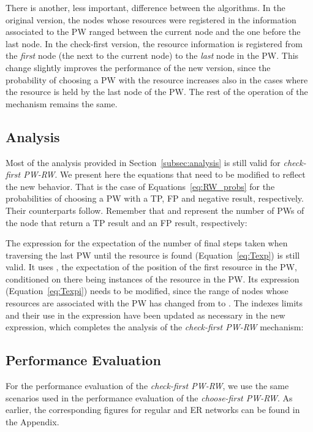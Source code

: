 \documentclass[]{elsarticle}
\begin{document}
There is another, less important, difference between the algorithms. In the original version, the nodes whose resources were registered in the information associated to the PW ranged between the current node and the one before the last node. In the check-first version, the resource information is registered from the \emph{first} node (the next to the current node) to the \emph{last} node in the PW. This change slightly improves the performance of the new version, since the probability of choosing a PW with the resource increases also in the cases where the resource is held by the last node of the PW. The rest of the operation of the mechanism remains the same. 

\subsection{Analysis}

Most of the analysis provided in Section~\ref{subsec:analysis} is still valid for \emph{check-first PW-RW}. We present here the equations that need to be modified to reflect the new behavior. That is the case of Equations~\ref{eq:RW_probs} for the probabilities of choosing a PW with a TP, FP and negative result, respectively. Their counterparts follow. Remember that  and  represent the number of PWs of the node that return a TP result and an FP result, respectively:



The expression for the expectation of the number of final steps taken when traversing the last PW until the resource is found (Equation~\ref{eq:Texp}) is still valid. It uses , the expectation of the position of the first resource in the PW, conditioned on there being  instances of the resource in the PW. Its expression (Equation~\ref{eq:Texpi}) needs to be modified, since the range of nodes whose resources are associated with the PW has changed from  to . The indexes limits and their use in the expression have been updated as necessary in the new expression, which completes the analysis of the \emph{check-first PW-RW} mechanism:



\subsection{Performance Evaluation}
\label{sec:perf_eval2}

For the performance evaluation of the \emph{check-first PW-RW}, we use the same scenarios used in the performance evaluation of the \emph{choose-first PW-RW}. As earlier, the corresponding figures for regular and ER networks can be found in the Appendix. \\
\end{document}
